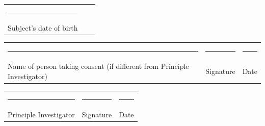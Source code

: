 \documentclass[a4paper,10pt]{article}
\begin{document}
\vspace{0.5cm}

 \begin{tabular}{p{4cm}p{4cm}p{4cm}}
    \rule{10em}{.3pt} & &  \\
     Subject's date of birth  & &  \\
 \end{tabular}

\vspace{0.5cm}

 \begin{tabular}{p{4cm}p{4cm}p{4cm}}
    \rule{10em}{.3pt} & \rule{10em}{.3pt} & \rule{10em}{.3pt} \\
     Name of person taking consent (if different from Principle Investigator) & Signature &  Date \\
\end{tabular}

\vspace{0.5cm}

 \begin{tabular}{p{4cm}p{4cm}p{4cm}}
    \rule{10em}{.3pt} & \rule{10em}{.3pt} & \rule{10em}{.3pt} \\
     Principle Investigator & Signature &  Date \\
 \end{tabular}
\end{document}
